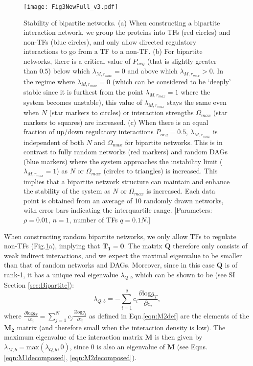 \documentclass[10pt]{article}
\begin{document}
\begin{figure}[ht]
    \centering
	\texttt{[image: Fig3NewFull\_v3.pdf]}
	\caption{Stability of bipartite networks. (a) When constructing a bipartite interaction network, we group the proteins into TFs (red circles) and non-TFs (blue circles), and only allow directed regulatory interactions to go from a TF to a non-TF. (b) For bipartite networks, there is a critical value of $P_{neg}$ (that is slightly greater than $0.5$) below which $\lambda_{M,r_{max}} = 0$ and above which $\lambda_{M,r_{max}} > 0$. In the regime where $\lambda_{M,r_{max}} = 0$ (which can be considered to be `deeply' stable since it is furthest from the point $\lambda_{M,r_{max}} = 1$ where the system becomes unstable), this value of $\lambda_{M,r_{max}}$ stays the same even when $N$ (star markers to circles) or interaction strengths $\Omega_{max}$ (star markers to squares) are increased. (c) When there is an equal fraction of up/down regulatory interactions $P_{neg}=0.5$, $\lambda_{M,r_{max}}$ is independent of both $N$ and $\Omega_{max}$ for bipartite networks. This is in contrast to fully random networks (red markers) and random DAGs (blue markers) where the system approaches the instability limit ($\lambda_{M,r_{max}} = 1$) as $N$ or $\Omega_{max}$ (circles to triangles) is increased. This implies that a bipartite network structure can maintain and enhance the stability of the system as $N$ or $\Omega_{max}$ is increased. Each data point is obtained from an average of 10 randomly drawn networks, with error bars indicating the interquartile range. [Parameters: $\rho = 0.01$, $n = 1$, number of TFs $q = 0.1N$.]}
	\label{fig:BipartiteStability}
\end{figure}

When constructing random bipartite networks, we only allow TFs to regulate non-TFs (Fig.\ref{fig:BipartiteStability}a), implying that $\mathbf{T_1} = \mathbf{0}$. The matrix $\mathbf{Q}$ therefore only consists of weak indirect interactions, and we expect the maximal eigenvalue to be smaller than that of random networks and DAGs. Moreover, since in this case $\mathbf{Q}$ is of rank-1, it has a unique real eigenvalue $\lambda_{Q,b}$ which can be shown to be (see SI Section \ref{sec:Bipartite}):
\begin{equation}
    \lambda_{Q,b} = -\sum_{i=1}^q c_i \frac{\partial \text{log} g_T}{\partial c_i},
    \label{eqn:lambda_bipartite}
\end{equation}
where $\frac{\partial \text{log} g_T}{\partial c_i} = \sum_{j=1}^N c_j \frac{\partial \text{log} g_j}{\partial c_i}$ as defined in Eqn.\ref{eqn:M2def} are the elements of the $\mathbf{M_2}$ matrix (and therefore small when the interaction density is low). The maximum eigenvalue of the interaction matrix $\mathbf{M}$ is then given by $\lambda_{M,b} = \text{max}(\lambda_{Q,b},0)$, since $0$ is also an eigenvalue of $\mathbf{M}$ (see Eqns. \ref{eqn:M1decomposed}, \ref{eqn:M2decomposed}).
\end{document}
